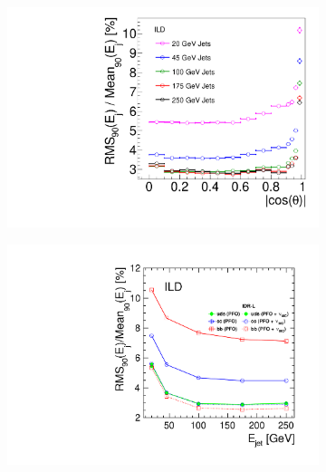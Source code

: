 \begin{figure}[htbp]
\begin{subfigure}{0.49\hsize}
 \caption{  \label{fig:perf:pfa_jer_endcap}}
 \end{subfigure}
\begin{subfigure}{0.49\hsize}
 \includegraphics[width=\hsize]{Performance/fig/JER_vs_cosTheta.pdf}
 \caption{ \label{fig:perf:pfa_costh}}
 \end{subfigure}
\begin{subfigure}{0.49\hsize}
 \includegraphics[width=\hsize]{Performance/fig/JERs_bcuds_pfo_vs_pfo_plus_nu.pdf}
 \caption{  \label{fig:perf:pfa_udscb}}
 \end{subfigure}
\begin{subfigure}{0.49\hsize}

\end{subfigure}
\end{figure}
